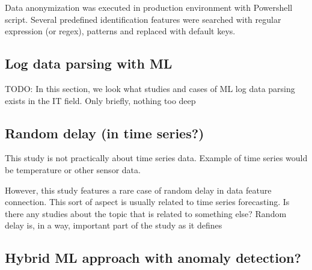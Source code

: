 Data anonymization was executed in production environment
with Powershell script.
Several predefined identification features were searched with
regular expression (or regex), patterns and replaced with
default keys.


\subsection{Log data parsing with ML}\label{subsec:bg-log-data-parsing-with-ml}
TODO: In this section, we look what studies and cases of ML log data parsing
exists in the IT field.
Only briefly, nothing too deep



\clearpage
{}

\subsection{Random delay (in time series?)}\label{subsec:bg-random-delay-in-time-series}

\begin{itcomment}
    This study is not practically about time series data.
    Example of time series would be temperature or other sensor data.

    However, this study features a rare case of random delay in data feature connection.
    This sort of aspect is usually related to time series forecasting.
    Is there any studies about the topic that is related to something else?
    Random delay is, in a way, important part of the study as it defines
\end{itcomment}

\subsection{Hybrid ML approach with anomaly detection?}\label{subsec:bg-hybrid-ml-approach-with-anomaly-detection}


